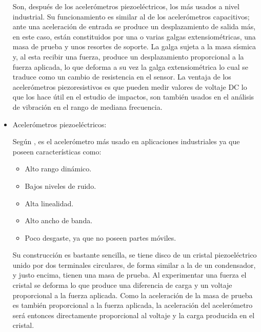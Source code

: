 \begin{itemize}
        Son, después de los acelerómetros piezoeléctricos, los más usados a nivel
        industrial. Su funcionamiento es similar al de los acelerómetros
        capacitivos; ante una aceleración de entrada se produce un desplazamiento
        de salida más, en este caso, están constituidos por una o varias
        galgas extensiométricas, una masa de prueba y unos resortes de soporte.
        La galga sujeta a la masa sísmica y, al esta recibir una fuerza, produce
        un desplazamiento proporcional a la fuerza aplicada, lo que deforma a
        su vez la galga extensiométrica lo cual se traduce como un
        cambio de resistencia en el sensor. La ventaja de los acelerómetros
        piezoresistivos es que pueden medir valores de voltaje DC lo que los
        hace útil en el estudio de impactos, son también usados en el
        análisis de vibración en el rango de mediana frecuencia.


    \item Acelerómetros piezoeléctricos:

        Según \textcite{WeberPiezoelectricAT}, es el acelerómetro más usado en
        aplicaciones industriales ya que
        poseen características como:

        \begin{itemize}[noitemsep]
            \item Alto rango dinámico.
            \item Bajos niveles de ruido.
            \item Alta linealidad.
            \item Alto ancho de banda.
            \item Poco desgaste, ya que no poseen partes móviles.
        \end{itemize}


        Su construcción es bastante sencilla, se tiene disco de un cristal
        piezoeléctrico unido por dos terminales circulares, de forma similar a
        la de un condensador, y justo encima, tienen una masa de prueba.
        Al experimentar una fuerza el cristal se deforma lo que produce una
        diferencia de carga y un voltaje proporcional a la fuerza aplicada.
        Como la aceleración de la masa de prueba es también proporcional a la
        fuerza aplicada, la aceleración del acelerómetro será entonces
        directamente proporcional al voltaje y la carga producida en el cristal.

\end{itemize}


